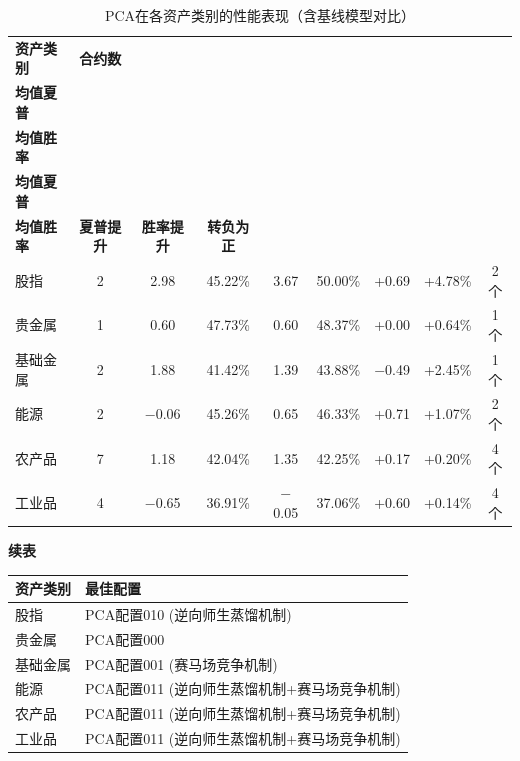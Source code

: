 \begin{table}[H]
\centering
\caption{PCA在各资产类别的性能表现（含基线模型对比）}
\label{tab:mgcaassetperformance}
\footnotesize
\setlength{\tabcolsep}{3pt}
\renewcommand{\arraystretch}{1.18}
\begin{tabular}{lcccccccc}
\toprule
\textbf{资产类别} & \textbf{合约数} & \makecell{\textbf{基线模型}\\\textbf{均值夏普}} & \makecell{\textbf{基线模型}\\\textbf{均值胜率}} & \makecell{\textbf{PCA}\\\textbf{均值夏普}} & \makecell{\textbf{PCA}\\\textbf{均值胜率}} & \textbf{夏普提升} & \textbf{胜率提升} & \textbf{转负为正} \\
\midrule
股指 & 2 & 2.98 & 45.22\% & 3.67 & 50.00\% & +0.69 & +4.78\% & 2个 \\
贵金属 & 1 & 0.60 & 47.73\% & 0.60 & 48.37\% & +0.00 & +0.64\% & 1个 \\
基础金属 & 2 & 1.88 & 41.42\% & 1.39 & 43.88\% & $-$0.49 & +2.45\% & 1个 \\
能源 & 2 & $-$0.06 & 45.26\% & 0.65 & 46.33\% & +0.71 & +1.07\% & 2个 \\
农产品 & 7 & 1.18 & 42.04\% & 1.35 & 42.25\% & +0.17 & +0.20\% & 4个 \\
工业品 & 4 & $-$0.65 & 36.91\% & $-$0.05 & 37.06\% & +0.60 & +0.14\% & 4个 \\
\bottomrule
\end{tabular}
\end{table}
\begin{table}[H]
\centering
{\small\textbf{续表}}\\[0.5em]
\footnotesize
\setlength{\tabcolsep}{6pt}
\renewcommand{\arraystretch}{1.18}
\begin{tabular}{lp{}}
\toprule
\textbf{资产类别} & \textbf{最佳配置} \\
\midrule
股指 & PCA配置010 (逆向师生蒸馏机制) \\
贵金属 & PCA配置000 \\
基础金属 & PCA配置001 (赛马场竞争机制) \\
能源 & PCA配置011 (逆向师生蒸馏机制+赛马场竞争机制) \\
农产品 & PCA配置011 (逆向师生蒸馏机制+赛马场竞争机制) \\
工业品 & PCA配置011 (逆向师生蒸馏机制+赛马场竞争机制) \\
\bottomrule
\end{tabular}
\end{table}

